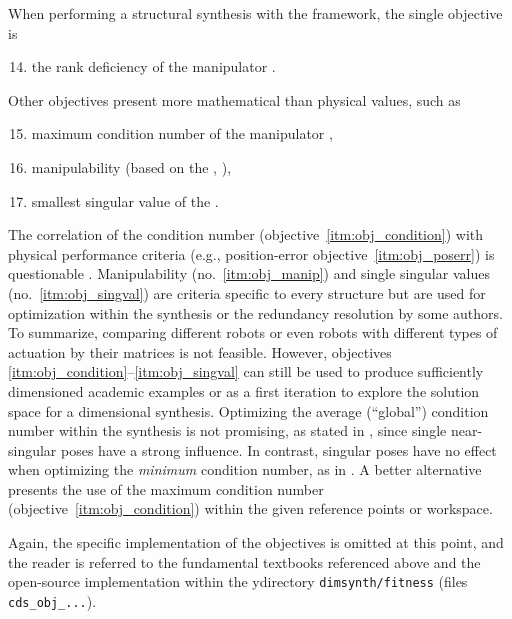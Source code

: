 When performing a structural synthesis with the framework, the single objective is
\begin{enumerate}
  \setcounter{enumi}{13}
  \item \label{itm:obj_rankjacobian} the rank deficiency of the manipulator .
\end{enumerate}

Other objectives present more mathematical than physical values, such as
\begin{enumerate}
  \setcounter{enumi}{14}
  \item \label{itm:obj_condition} maximum condition number of the manipulator ,
  \item \label{itm:obj_manip} manipulability (based on the , \cite{Merlet2006a}),
  \item \label{itm:obj_singval} smallest singular value of the .
\end{enumerate}
%

%

%

The correlation of the  condition number (objective~\ref*{itm:obj_condition}) with physical performance criteria (e.g., position-error objective~\ref*{itm:obj_poserr}) is questionable \cite{Merlet2006a}.
Manipulability (no.~\ref*{itm:obj_manip}) and single singular values (no.~\ref*{itm:obj_singval}) are criteria specific to every structure but are used for optimization within the synthesis or the redundancy resolution by some authors.
To summarize, comparing different robots or even robots with different types of actuation by their  matrices is not feasible.
%
However, objectives \ref*{itm:obj_condition}--\ref*{itm:obj_singval} can still be used to produce sufficiently dimensioned academic examples or as a first iteration to explore the solution space for a dimensional synthesis.
Optimizing the average (``global'') condition number within the synthesis is not promising, as stated in \cite{JamwalHusXie2015}, since single near-singular poses have a strong influence.
In contrast, singular poses have no effect when optimizing the \emph{minimum} condition number, as in \cite{SuDuaZhe2001}.
A better alternative presents the use of the maximum condition number (objective~\ref*{itm:obj_condition}) within the given reference points or workspace.

Again, the specific implementation of the objectives is omitted at this point, and the reader is referred to the fundamental textbooks referenced above and the open-source implementation  %
%
\cite{GitHub_StructDimSynth} within the ydirectory \texttt{dimsynth/fitness} (files \texttt{cds\_obj\_...}).

